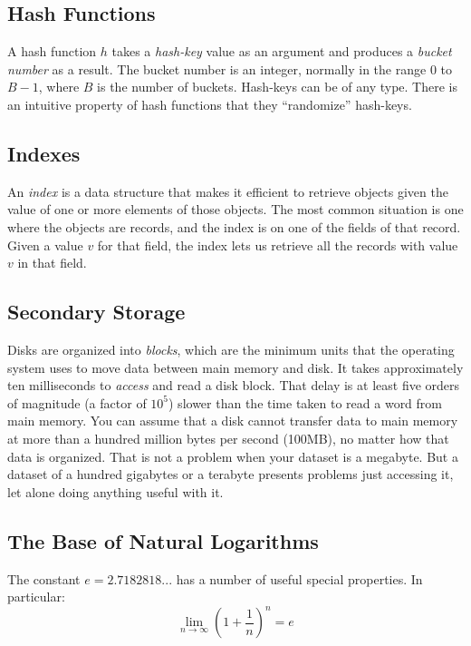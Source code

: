 \subsection{Hash Functions}\label{subsec:hash-functions}

A hash function $h$ takes a \textit{hash-key} value as an argument and produces a \textit{bucket number} as a result. The bucket number is an integer, normally in the range $0$ to $B - 1$, where $B$ is the number of buckets. Hash-keys can be of any type. There is an intuitive property of hash functions that they ``randomize'' hash-keys.

\subsection{Indexes}\label{subsec:indexes}

An \textit{index} is a data structure that makes it efficient to retrieve objects given the value of one or more elements of those objects. The most common situation is one where the objects are records, and the index is on one of the fields of that record. Given a value $v$ for that field, the index lets us retrieve all the records with value $v$ in that field.

\subsection{Secondary Storage}\label{subsec:secondary-storage}

Disks are organized into \textit{blocks}, which are the minimum units that the operating system uses to move data between main memory and disk. It takes approximately ten milliseconds to \textit{access} and read a disk block. That delay is at least five orders of magnitude (a factor of $10^5$) slower than the time taken to read a word from main memory. You can assume that a disk cannot transfer data to main memory at more than a hundred million bytes per second (100MB), no matter how that data is organized. That is not a problem when your dataset is a megabyte. But a dataset of a hundred gigabytes or a terabyte presents problems just accessing it, let alone doing anything useful with it.

\subsection{The Base of Natural Logarithms}\label{subsec:the-base-of-natural-logarithms}

The constant $e = 2.7182818...$ has a number of useful special properties. In particular:
\begin{equation*}
    \lim_{n \to \infty} \left(1 + \frac{1}{n}\right)^n = e
\end{equation*}

